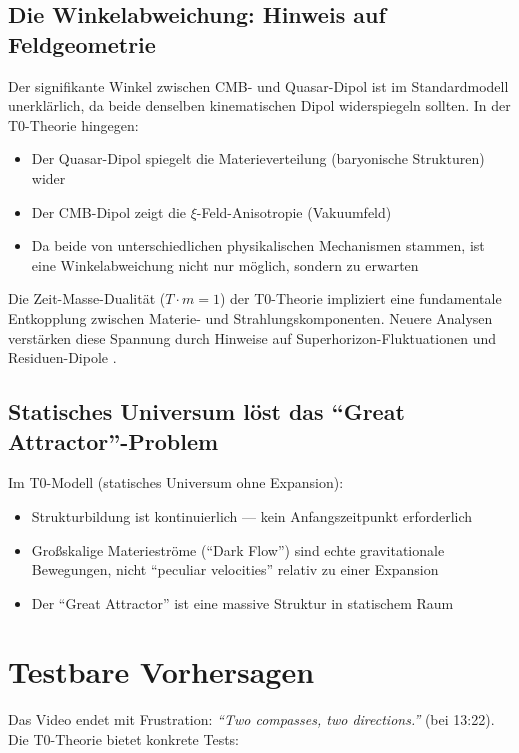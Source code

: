 	\subsection{Die Winkelabweichung: Hinweis auf Feldgeometrie}

	Der signifikante Winkel zwischen CMB- und Quasar-Dipol ist im Standardmodell unerklärlich, da beide denselben kinematischen Dipol widerspiegeln sollten. In der T0-Theorie hingegen:
	\begin{itemize}
		\item Der Quasar-Dipol spiegelt die Materieverteilung (baryonische Strukturen) wider
		\item Der CMB-Dipol zeigt die $\xi$-Feld-Anisotropie (Vakuumfeld)
		\item Da beide von unterschiedlichen physikalischen Mechanismen stammen, ist eine Winkelabweichung nicht nur möglich, sondern zu erwarten
	\end{itemize}

	Die Zeit-Masse-Dualität ($T \cdot m = 1$) der T0-Theorie impliziert eine fundamentale Entkopplung zwischen Materie- und Strahlungskomponenten. Neuere Analysen verstärken diese Spannung durch Hinweise auf Superhorizon-Fluktuationen und Residuen-Dipole \cite{sarkar2025, bengaly2025}.

	\subsection{Statisches Universum löst das ``Great Attractor''-Problem}

	Im T0-Modell (statisches Universum ohne Expansion):
	\begin{itemize}
		\item Strukturbildung ist kontinuierlich --- kein Anfangszeitpunkt erforderlich
		\item Großskalige Materieströme (``Dark Flow'') sind echte gravitationale Bewegungen, nicht ``peculiar velocities'' relativ zu einer Expansion
		\item Der ``Great Attractor'' ist eine massive Struktur in statischem Raum
	\end{itemize}

\section{Testbare Vorhersagen}

	Das Video endet mit Frustration: \textit{``Two compasses, two directions.''} (bei 13:22). Die T0-Theorie bietet konkrete Tests:

